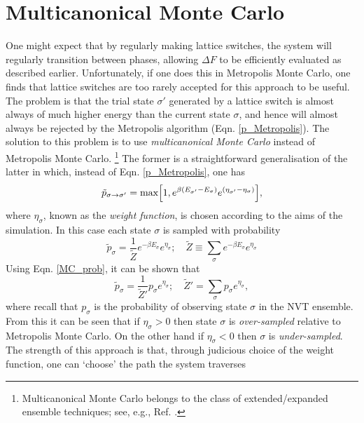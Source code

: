 \documentclass{report}
\begin{document}
\section{Multicanonical Monte Carlo}
One might expect that by regularly making lattice switches, the system will regularly transition between phases, allowing $\Delta F$ to be efficiently 
evaluated as described earlier. Unfortunately, if one does this in Metropolis Monte Carlo, one finds that lattice switches are too rarely accepted for 
this approach to be useful. 
The problem is that the trial state $\sigma'$ generated by a lattice switch is almost always of much higher energy than the current state $\sigma$, 
and hence will almost always be rejected by the Metropolis algorithm (Eqn. \eqref{p_Metropolis}). 
The solution to this problem is to use \emph{multicanonical Monte Carlo}\cite{Berg_1991,Berg_1992,Smith_1995} instead of Metropolis Monte Carlo.
\footnote{Multicanonical Monte Carlo belongs to the class of extended/expanded ensemble techniques; see, e.g., Ref. \cite{Iba_2001}.}
The former is a straightforward generalisation of the latter in which, instead of Eqn. \eqref{p_Metropolis}, one has
\begin{equation}\label{p_multicanonical}
\tilde{p}_{\sigma\to\sigma'}=\text{max}\Bigl[1,e^{\beta(E_{\sigma'}-E_{\sigma})}e^{(\eta_{\sigma'}-\eta_{\sigma})}\Bigr],
\end{equation}
where $\eta_{\sigma}$, known as the \emph{weight function}, is chosen according to the aims of the simulation. In this case each state $\sigma$ is 
sampled with probability
\begin{equation}\label{MCMC_prob}
\tilde{p}_{\sigma}=\frac{1}{\tilde{Z}}e^{-\beta E_{\sigma}}e^{\eta_{\sigma}}; \quad \tilde{Z}\equiv\sum_{\sigma}e^{-\beta E_{\sigma}}e^{\eta_{\sigma}}
\end{equation}
Using Eqn. \eqref{MC_prob}, it can be shown that
\begin{equation}\label{MCMC_prob_2}
\tilde{p}_{\sigma}=\frac{1}{\tilde{Z}'}p_{\sigma}e^{\eta_{\sigma}}; \quad \tilde{Z}'=\sum_{\sigma}p_{\sigma}e^{\eta_{\sigma}},
\end{equation}
where recall that $p_{\sigma}$ is the probability of observing state $\sigma$ in the NVT ensemble. From this it can be seen that if 
$\eta_{\sigma}>0$ then state $\sigma$ is \emph{over-sampled} relative to Metropolis Monte Carlo. On the other hand if $\eta_{\sigma}<0$ then 
$\sigma$ is \emph{under-sampled}. 
The strength of this approach is that, through judicious choice of the weight function, one can `choose' the path the system traverses 
\end{document}
